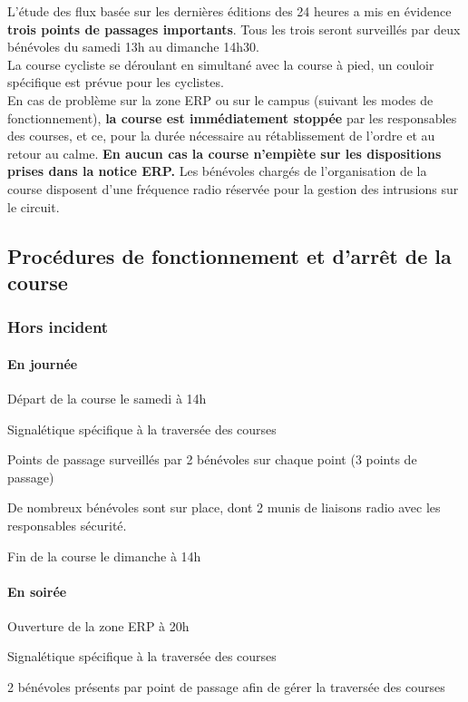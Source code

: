 \documentclass[hidelinks, paper=a4, fontsize=13pt]{report}
\begin{document}
L’étude des flux basée sur les dernières éditions des 24 heures a mis en évidence \textbf{trois points de passages importants}. Tous les trois seront surveillés par deux bénévoles du samedi 13h au dimanche 14h30.\\

La course cycliste se déroulant en simultané avec la course à pied, un couloir spécifique est prévue pour les cyclistes.\\

En cas de problème sur la zone ERP ou sur le campus (suivant les modes de fonctionnement), \textbf{la course est immédiatement stoppée} par les responsables des courses, et ce, pour la durée nécessaire au rétablissement de l’ordre et au retour au calme. \textbf{En aucun cas la course n’empiète sur les dispositions prises dans la notice ERP.} Les bénévoles chargés de l’organisation de la course disposent d’une fréquence radio réservée pour la gestion des intrusions sur le circuit.

\subsection{Procédures de fonctionnement et d’arrêt de la course}

\subsubsection{Hors incident}

\paragraph{En journée}
\begin{list}{•}{}
\item Départ de la course le samedi à 14h
\item Signalétique spécifique à la traversée des courses
\item Points de passage surveillés par 2 bénévoles sur chaque point (3 points de passage)
\item De nombreux bénévoles sont sur place, dont 2 munis de liaisons radio avec les responsables sécurité.
\item Fin de la course le dimanche à 14h
\end{list}

\paragraph{En soirée}
\begin{list}{•}{}
\item Ouverture de la zone ERP à 20h
\item Signalétique spécifique à la traversée des courses
\item 2 bénévoles présents par point de passage afin de gérer la traversée des courses
\end{list}
\end{document}
